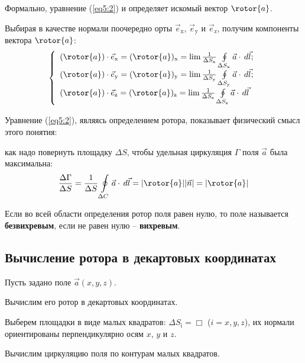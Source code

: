 	Формально, уравнение (\ref{eq5:2}) и определяет искомый вектор \( \rotor{a} \).
	
	Выбирая в качестве нормали поочередно орты \( \vec{e}_\mathrm{x} \), \( \vec{e}_\mathrm{y} \) и \( \vec{e}_\mathrm{z} \), получим компоненты вектора \( \rotor{a} \):
	\[ \left\{ \begin{array}{l}
	(\rotor{a})\cdot\vec{e}_\mathrm{x} = (\rotor{a})_\mathrm{x} = \lim\frac{1}{\Delta S_\mathrm{x}}\oint\limits_{\Delta S_\mathrm{x}} \vec{a}\cdot\,d\vec{l}; \\
	(\rotor{a})\cdot\vec{e}_\mathrm{y} = (\rotor{a})_\mathrm{y} = \lim\frac{1}{\Delta S_\mathrm{y}}\oint\limits_{\Delta S_\mathrm{y}} \vec{a}\cdot\,d\vec{l}; \\
	(\rotor{a})\cdot\vec{e}_\mathrm{z} = (\rotor{a})_\mathrm{z} = \lim\frac{1}{\Delta S_\mathrm{z}}\oint\limits_{\Delta S_\mathrm{z}} \vec{a}\cdot\,d\vec{l}
	\end{array} \right. \]
	
	\begin{remark}
	Уравнение (\ref{eq5:2}), являясь определением ротора, показывает физический смысл этого понятия:
	
	как надо повернуть площадку \( \Delta S \), чтобы удельная циркуляция \( \Gamma \) поля \( \vec{a} \) была максимальна:
	\[ \frac{\Delta \Gamma}{\Delta S} = \frac{1}{\Delta S}\oint\limits_{\Delta C} \vec{a}\cdot\,d\vec{l} = |\rotor{a}||\vec{n}| = |\rotor{a}| \]
	\end{remark}
	
	\begin{remark}
	Если во всей области определения ротор поля равен нулю, то поле называется \textbf{безвихревым}, если не равен нулю -- \textbf{вихревым}.
	\end{remark}

\subsection{Вычисление ротора в декартовых координатах}

	Пусть задано поле \( \vec{a}(x, y, z) \).
	
	Вычислим его ротор в декартовых координатах.
	
	Выберем площадки в виде малых квадратов: \( \Delta S_\mathrm{i} = \Box \) (\( i = x, y, z \)), их нормали ориентированы перпендикулярно осям \( x \), \( y \) и \( z \).	
	
	Вычислим циркуляцию поля по контурам малых квадратов.
	
